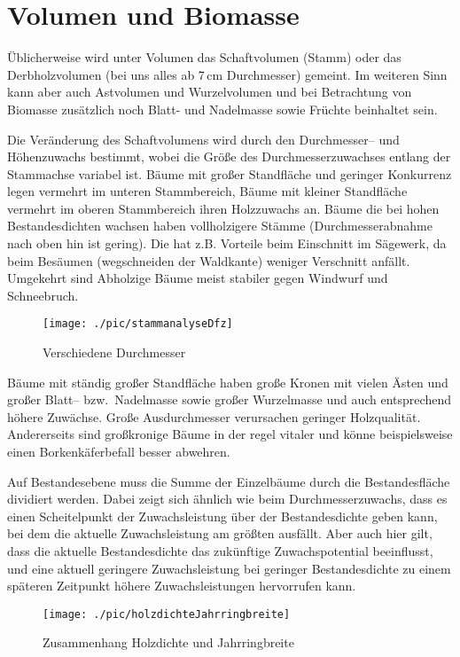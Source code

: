 \documentclass[twocolumn]{scrartcl}
\begin{document}
\section{Volumen und Biomasse}

Üblicherweise wird unter Volumen das Schaftvolumen (Stamm) oder das
Derbholzvolumen (bei uns alles ab 7\,cm Durchmesser) gemeint. Im weiteren Sinn
kann aber auch Astvolumen und Wurzelvolumen und bei Betrachtung von Biomasse
zusätzlich noch Blatt- und Nadelmasse sowie Früchte beinhaltet sein.

Die Veränderung des Schaftvolumens wird durch den Durchmesser-- und Höhenzuwachs
bestimmt, wobei die Größe des Durchmesserzuwachses entlang der Stammachse
variabel ist. Bäume mit großer Standfläche und geringer Konkurrenz legen
vermehrt im unteren Stammbereich, Bäume mit kleiner Standfläche vermehrt im
oberen Stammbereich ihren Holzzuwachs an. Bäume die bei hohen Bestandesdichten
wachsen haben vollholzigere Stämme (Durchmesserabnahme nach oben hin ist
gering). Die hat z.B. Vorteile beim Einschnitt im Sägewerk, da beim Besäumen
(wegschneiden der Waldkante) weniger Verschnitt anfällt. Umgekehrt sind
Abholzige Bäume meist stabiler gegen Windwurf und Schneebruch.

\begin{figure}[htbp]
  \centering
  \texttt{[image: ./pic/stammanalyseDfz]}
  \caption{Verschiedene Durchmesser}
  \label{fig:stammanalyseDfz}
\end{figure}


Bäume mit ständig großer Standfläche haben große Kronen mit vielen Ästen und
großer Blatt-- bzw.\ Nadelmasse sowie großer Wurzelmasse und auch entsprechend
höhere Zuwächse. Große Ausdurchmesser verursachen geringer Holzqualität.
Andererseits sind großkronige Bäume in der regel vitaler und könne
beispielsweise einen Borkenkäferbefall besser abwehren.

Auf Bestandesebene muss die Summe der Einzelbäume durch die Bestandesfläche
dividiert werden. Dabei zeigt sich ähnlich wie beim Durchmesserzuwachs, dass es
einen Scheitelpunkt der Zuwachsleistung über der Bestandesdichte geben kann, bei
dem die aktuelle Zuwachsleistung am größten ausfällt. Aber auch hier gilt, dass
die aktuelle Bestandesdichte das zukünftige Zuwachspotential beeinflusst, und
eine aktuell geringere Zuwachsleistung bei geringer Bestandesdichte zu einem
späteren Zeitpunkt höhere Zuwachsleistungen hervorrufen kann.

\begin{figure}[htbp]
  \centering
  \texttt{[image: ./pic/holzdichteJahrringbreite]}
  \caption{Zusammenhang Holzdichte und Jahrringbreite}
  \label{fig:holzdichteJahrringbreite}
\end{figure}
\end{document}
